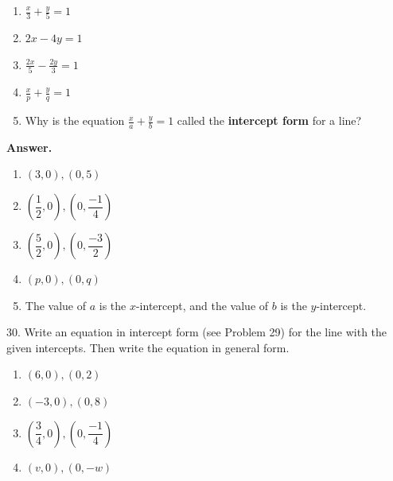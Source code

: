 \documentclass[10pt,]{book}
\newcommand{\terminology}[1]{\textbf{#1}}
\theoremstyle{plain}
\theoremstyle{definition}
\theoremstyle{definition}
\theoremstyle{definition}
\numberwithin{equation}{part}
\begin{document}
\begin{exerciselist}
\leavevmode%
\begin{multicols}{2}
\begin{enumerate}[label=*\alph**]
\item\hypertarget{li-203}{}\(\displaystyle{\frac{x}{3}+\frac{y}{5}=1} \)%
\item\hypertarget{li-204}{}\(\displaystyle{2x − 4y = 1} \)%
\item\hypertarget{li-205}{}\(\displaystyle{\frac{2x}{5}-\frac{2y}{3}=1} \)%
\item\hypertarget{li-206}{}\(\displaystyle{\frac{x}{p}+\frac{y}{q}=1} \)%
\item\hypertarget{li-207}{}Why is the equation \(\displaystyle{\frac{x}{a}+\frac{y}{b}=1} \) called the \terminology{intercept form} for a line?%
\end{enumerate}
\end{multicols}
\par\smallskip
\par\smallskip
\noindent\textbf{Answer.}\hypertarget{answer-22}{}\quad
\leavevmode%
\begin{multicols}{2}
\begin{enumerate}[label=*\alph**]
\item\hypertarget{li-208}{}\((3,0), (0,5) \)%
\item\hypertarget{li-209}{}\(\left(\dfrac{1}{2},0\right), \left(0,\dfrac{-1}{4}\right) \)%
\item\hypertarget{li-210}{}\(\left(\dfrac{5}{2},0\right), \left(0,\dfrac{-3}{2}\right) \)%
\item\hypertarget{li-211}{}\((p,0), (0,q) \)%
\item\hypertarget{li-212}{}The value of \(a\) is the \(x\)-intercept, and the value of \(b\) is the \(y\)-intercept.%
\end{enumerate}
\end{multicols}
%
\item[30.]\hypertarget{exercise-37}{}Write an equation in intercept form (see Problem 29) for the line with the given intercepts. Then write the equation in general form.%
\leavevmode%
\begin{multicols}{2}
\begin{enumerate}[label=*\alph**]
\item\hypertarget{li-213}{}\((6, 0), (0, 2) \)%
\item\hypertarget{li-214}{}\((−3, 0), (0, 8) \)%
\item\hypertarget{li-215}{}\(\left(\dfrac{3}{4}, 0\right), \left(0, \dfrac{-1}{4}\right) \)%
\item\hypertarget{li-216}{}\((v, 0), (0, −w) \)%

\end{enumerate}
\end{multicols}
\end{exerciselist}
\end{document}
